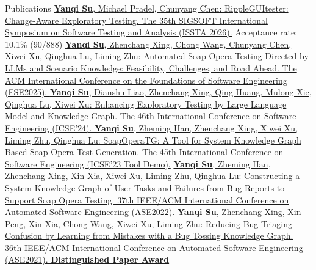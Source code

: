 \documentclass[
	11pt, %
]{resume} %
\begin{document}
\begin{rSection}{Publications}
 \href{https://dl.acm.org/doi/10.1145/3832240}{\textbf{Yanqi Su}, Michael Pradel, Chunyang Chen: RippleGUItester: Change-Aware Exploratory Testing. The 35th SIGSOFT International Symposium on Software Testing and Analysis (ISSTA 2026).} Acceptance rate: 10.1\% (90/888)
\newline\newline
 \href{https://dl.acm.org/doi/10.1145/3715752}{\textbf{Yanqi Su}, Zhenchang Xing, Chong Wang, Chunyang Chen, Xiwei Xu, Qinghua Lu, Liming Zhu: Automated Soap Opera Testing Directed by LLMs and Scenario Knowledge: Feasibility, Challenges, and Road Ahead. The ACM International Conference on the Foundations of Software Engineering (FSE2025). }
\newline\newline
 \href{https://conf.researchr.org/details/icse-2024/icse-2024-research-track/157/Enhancing-Exploratory-Testing-by-Large-Language-Model-and-Knowledge-Graph}{\textbf{Yanqi Su}, Dianshu Liao, Zhenchang Xing, Qing Huang, Mulong Xie, Qinghua Lu, Xiwei Xu:
Enhancing Exploratory Testing by Large Language Model and Knowledge Graph. The 46th International Conference on Software Engineering (ICSE'24). }
\newline\newline
\href{https://ieeexplore.ieee.org/document/10172537}{\textbf{Yanqi Su}, Zheming Han, Zhenchang Xing, Xiwei Xu, Liming Zhu, Qinghua Lu:
SoapOperaTG: A Tool for System Knowledge Graph Based Soap Opera Test Generation. The 45th International Conference on Software Engineering (ICSE'23 Tool Demo).}
\newline\newline
\href{https://dl.acm.org/doi/abs/10.1145/3551349.3556967}{\textbf{Yanqi Su}, Zheming Han, Zhenchang Xing, Xin Xia, Xiwei Xu, Liming Zhu, Qinghua Lu:
Constructing a System Knowledge Graph of User Tasks and Failures from Bug Reports to Support Soap Opera Testing. 37th IEEE/ACM International Conference on Automated Software Engineering (ASE2022).}\newline\newline
\href{https://ieeexplore.ieee.org/document/9678574}{\textbf{Yanqi Su}, Zhenchang Xing, Xin Peng, Xin Xia, Chong Wang, Xiwei Xu, Liming Zhu:
Reducing Bug Triaging Confusion by Learning from Mistakes with a Bug Tossing Knowledge Graph. 36th IEEE/ACM International Conference on Automated Software Engineering (ASE2021). \newline
\faMedal \hspace{0.5em}\textbf{Distinguished Paper Award}}\newline\newline

\end{rSection}
\end{document}
